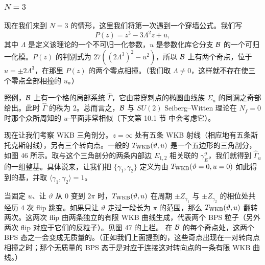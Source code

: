 \subsubsection{$N=3$} \label{sec:N3}

现在我们来到 $N=3$ 的情形，这里我们将第一次遇到一个穿墙公式。我们写
\begin{equation} \label{eq:N3}
P(z) = z^3 - 3 \Lambda^2 z + u,
\end{equation}
其中 $\Lambda$ 是定义该理论的一个不可归一化参数，$u$ 是参数化库仑分支 $\mathcal{B}$ 的一个可归一化模。$P(z)$ 的判别式为 $27((2\Lambda^3)^2-u^2)$，所以 $\mathcal{B}$ 上有两个奇点，位于 $u = \pm 2 \Lambda^3$，在那里 $P(z)$ 的两个零点相撞。（我们取 $\Lambda \neq 0$，这样就不存在使三个零点全部相撞的 $u$。）

照例，$\mathcal{B}$ 上有一个格的局部系统 $\hat\Gamma$，它由带穿刺点的椭圆曲线族 $\Sigma_u$ 的同调之奇部给出。此时 $\hat\Gamma$ 的秩为 $2$。总而言之，$\mathcal{B}$ 与 $SU(2)$ Seiberg–Witten 理论在 $N_f = 0$ 时那个众所周知的 $u$-平面非常相似（下文第 10.1 节%
中会考虑它）。


现在让我们考察 WKB 三角剖分。$z = \infty$ 处有五条 WKB 射线（相应地有五条斯托克斯射线），另有三个转向点。一般的 $T_{\rm WKB}(\vartheta, u)$ 是一个五边形的三角剖分，如图 46 所示。取与这个三角剖分的两条内部边 $E_{1,2}$ 相关联的 $\gamma_E^\vartheta$，我们就得到 $\hat\Gamma_u$ 的一组整基。具体说来，让我们把 $\{\gamma_1, \gamma_2\}$ 定义为由 $T_{\rm WKB}(\vartheta = 0, u = 0)$ 如此得到的基，并取 $\langle \gamma_1, \gamma_2 \rangle = 1$。

当固定 $u$、让 $\vartheta$ 从 $0$ 变到 $2 \pi$ 时，$T_{\rm WKB}(\vartheta,u)$ 在周期 $\pm Z_{\gamma_1}$ 与 $\pm Z_{\gamma_2}$ 的相位处共经历 $4$ 次 flip 跳变。如果只让 $\vartheta$ 走过一段长为 $\pi$ 的范围，那么 $T_{\rm WKB}(\vartheta,u)$ 翻转两次。这两次 flip 由两条独立的有限 WKB 曲线生成，代表两个 BPS 粒子（另外两次 flip 对应于它们的反粒子）。见图 47 的上栏。 在 $\mathcal{B}$ 的每个奇点处，这两个 BPS 态之一会变成无质量的。（正如我们上面提到的，这些奇点出现在一对转向点相撞之时；那个无质量的 BPS 态于是对应于连接这对转向点的一条有限 WKB 曲线。）

